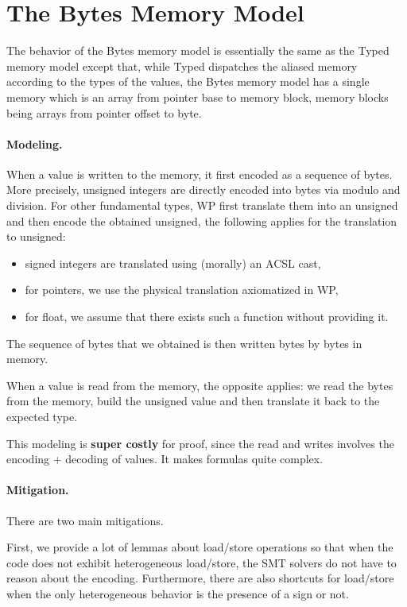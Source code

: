 \section{The Bytes Memory Model}
\label{sec:bytes-model}

The behavior of the Bytes memory model is essentially the same as the Typed
memory model except that, while Typed dispatches the aliased memory according
to the types of the values, the Bytes memory model has a single memory which
is an array from pointer base to memory block, memory blocks being arrays from
pointer offset to byte.

\paragraph{Modeling.} When a value is written to the memory, it first encoded
as a sequence of bytes. More precisely, unsigned integers are directly encoded
into bytes via modulo and division. For other fundamental types, WP first
translate them into an unsigned and then encode the obtained unsigned, the
following applies for the translation to unsigned:
\begin{itemize}
  \item signed integers are translated using (morally) an ACSL cast,
  \item for pointers, we use the physical translation axiomatized in WP,
  \item for float, we assume that there exists such a function without providing it.
\end{itemize}
The sequence of bytes that we obtained is then written bytes by bytes in memory.

When a value is read from the memory, the opposite applies: we read the bytes
from the memory, build the unsigned value and then translate it back to the
expected type.

This modeling is \textbf{super costly} for proof, since the read and writes
involves the encoding + decoding of values. It makes formulas quite complex.

\paragraph{Mitigation.} There are two main mitigations.

First, we provide a lot of lemmas about load/store operations so that when the
code does not exhibit heterogeneous load/store, the SMT solvers do not have to
reason about the encoding. Furthermore, there are also shortcuts for load/store
when the only heterogeneous behavior is the presence of a sign or not.

